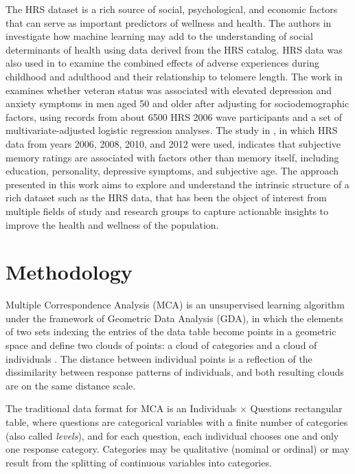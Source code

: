 \documentclass[conference,final,]{IEEEtran}
\begin{document}
The HRS dataset is a rich source of social, psychological, and economic
factors that can serve as important predictors of wellness and health.
The authors in \cite{seligman2018machine} investigate how machine
learning may add to the understanding of social determinants of health
using data derived from the HRS catalog. HRS data was also used in
\cite{puterman2016lifespan} to examine the combined effects of adverse
experiences during childhood and adulthood and their relationship to
telomere length. The work in \cite{christine_nodate} examines whether
veteran status was associated with elevated depression and anxiety
symptoms in men aged 50 and older after adjusting for sociodemographic
factors, using records from about 6500 HRS 2006 wave participants and a
set of multivariate-adjusted logistic regression analyses. The study in
\cite{gizem_nodate}, in which HRS data from years 2006, 2008, 2010, and
2012 were used, indicates that subjective memory ratings are associated
with factors other than memory itself, including education, personality,
depressive symptoms, and subjective age. The approach presented in this
work aims to explore and understand the intrinsic structure of a rich
dataset such as the HRS data, that has been the object of interest from
multiple fields of study and research groups to capture actionable
insights to improve the health and wellness of the population.

\hypertarget{methodology}{%
\section{Methodology}\label{methodology}}

Multiple Correspondence Analysis (MCA) is an unsupervised learning
algorithm under the framework of Geometric Data Analysis (GDA), in which
the elements of two sets indexing the entries of the data table become
points in a geometric space and define two clouds of points: a cloud of
categories and a cloud of individuals \cite{le2010multiple}. The
distance between individual points is a reflection of the dissimilarity
between response patterns of individuals, and both resulting clouds are
on the same distance scale.

The traditional data format for MCA is an Individuals \(\times\)
Questions rectangular table, where questions are categorical variables
with a finite number of categories (also called \emph{levels}), and for
each question, each individual chooses one and only one response
category. Categories may be qualitative (nominal or ordinal) or may
result from the splitting of continuous variables into categories.
\end{document}
